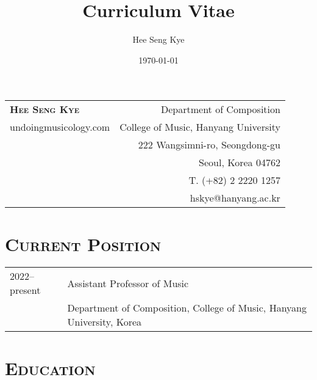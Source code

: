 \documentclass[letter,11pt,draft]{article}
\title{Curriculum Vitae}
\author{Hee Seng Kye}
\date{\today}
\begin{document}
  \renewcommand{\headrulewidth}{0pt}
  \fancyhf{}
  \fancyfoot[RE,RO]{\small \thepage}
  
  \raggedright \parindent=15pt
  
  \hspace*{-0.8cm}
  \begin{tabular}{p{10.31cm} r}
    {\Large \textsc{\textbf{Hee Seng Kye}}} & Department of Composition\\
    undoingmusicology.com & College of Music, Hanyang University\\
    & 222 Wangsimni-ro, Seongdong-gu\\
    & Seoul, Korea 04762\\
    & T. (+82) 2 2220 1257\\
    & hskye@hanyang.ac.kr
  \end{tabular}
  
  \vspace{10mm}
  
  \section*{\textsc{Current Position}}
  
  \hspace*{-0.25cm}
  \begin{tabular}{p{2.5cm} l}
    2022--present & Assistant Professor of Music\\
    & Department of Composition, College of Music, Hanyang University, Korea
  \end{tabular}
  
  \vspace*{2.5mm}
  
  \section*{\textsc{Education}}
  
\end{document}
